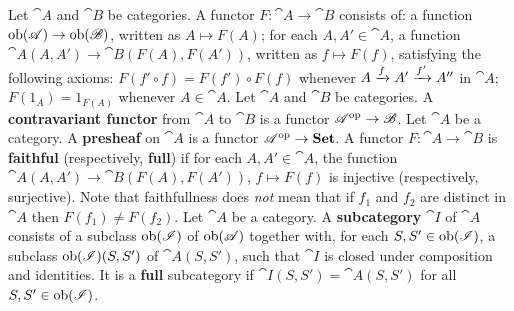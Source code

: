  Let $\cat{A}$ and $\cat B$ be categories. A functor $F : \cat A \to \cat B$ consists of: a function $\mathrm{ob}(\mathscr{A}) \to \mathrm{ob}(\mathscr{B})$, written as $A \mapsto F(A)$; for each $A,A' \in \cat A$, a function $\cat A(A, A') \to \cat B(F(A), F(A'))$, written as $f \mapsto F(f)$, satisfying the following axioms: $F(f' \circ f) = F(f') \circ F(f)$ whenever $A \xrightarrow[]{f} A' \xrightarrow[]{f'} A''$ in $\cat A$; $F(1_A) = 1_{F(A)}$ whenever $A \in \cat A$.
 Let $\cat A$ and $\cat B$ be categories. A \textbf{contravariant functor} from $\cat A$ to $\cat B$ is a functor $\mathscr{A}^{\operatorname{op}} \to \mathscr{B}$.
 Let $\cat A$ be a category. A \textbf{presheaf} on $\cat A$ is a functor $\mathscr{A}^{\operatorname{op}} \to \operatorname{\mathbf{Set}}$.
 A functor $F: \cat A \to \cat B$ is \textbf{faithful} (respectively, \textbf{full}) if for each $A, A' \in \cat A$, the function $\cat{A}(A,A') \to \cat{B}(F(A), F(A'))$, $f \mapsto F(f)$ is injective (respectively, surjective). Note that faithfullness does \textit{not} mean that if $f_1$ and $f_2$ are distinct in $\cat A$ then $F(f_1) \ne F(f_2)$.
 Let $\cat A$ be a category. A \textbf{subcategory} $\cat{I}$ of $\cat A$ consists of a subclass $\mathrm{ob}(\mathscr{I})$ of $\mathrm{ob}(\mathscr{A})$ together with, for each $S, S' \in \mathrm{ob}(\mathscr{I})$, a subclass $\mathrm{ob}(\mathscr{I}) (S, S')$ of $\cat{A}(S,S')$, such that $\cat I$ is closed under composition and identities. It is a \textbf{full} subcategory if $\cat{I}(S,S') = \cat{A}(S,S')$ for all $S, S' \in \mathrm{ob}(\mathscr{I})$.